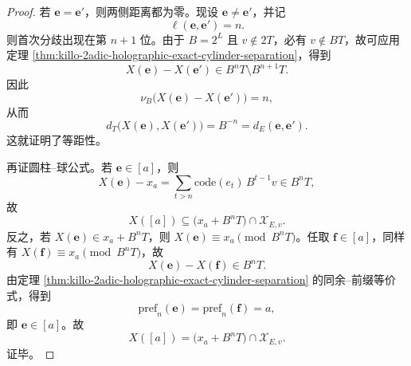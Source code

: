 \begin{proof}
若 \(\mathbf e=\mathbf e'\)，则两侧距离都为零。现设 \(\mathbf e\neq \mathbf e'\)，并记
\[
\ell(\mathbf e,\mathbf e')=n.
\]
则首次分歧出现在第 \(n+1\) 位。由于 \(B=2^L\) 且 \(v\notin 2T\)，必有 \(v\notin BT\)，故可应用定理 \ref{thm:killo-2adic-holographic-exact-cylinder-separation}，得到
\[
X(\mathbf e)-X(\mathbf e')
\in
B^nT\setminus B^{n+1}T.
\]
因此
\[
\nu_B\bigl(X(\mathbf e)-X(\mathbf e')\bigr)=n,
\]
从而
\[
d_T\bigl(X(\mathbf e),X(\mathbf e')\bigr)=B^{-n}=d_E(\mathbf e,\mathbf e').
\]
这就证明了等距性。
\par
再证圆柱--球公式。若 \(\mathbf e\in[a]\)，则
\[
X(\mathbf e)-x_a
=
\sum_{t>n}\mathrm{code}(e_t)\,B^{t-1}v\in B^nT,
\]
故
\[
X([a])\subseteq \bigl(x_a+B^nT\bigr)\cap\mathcal X_{E,v}.
\]
反之，若 \(X(\mathbf e)\in x_a+B^nT\)，则 \(X(\mathbf e)\equiv x_a\pmod{B^nT}\)。任取 \(\mathbf f\in[a]\)，同样有 \(X(\mathbf f)\equiv x_a\pmod{B^nT}\)，故
\[
X(\mathbf e)-X(\mathbf f)\in B^nT.
\]
由定理 \ref{thm:killo-2adic-holographic-exact-cylinder-separation} 的同余--前缀等价式，得到
\[
\mathrm{pref}_n(\mathbf e)=\mathrm{pref}_n(\mathbf f)=a,
\]
即 \(\mathbf e\in[a]\)。故
\[
X([a])=\bigl(x_a+B^nT\bigr)\cap \mathcal X_{E,v}.
\]
证毕。
\end{proof}

